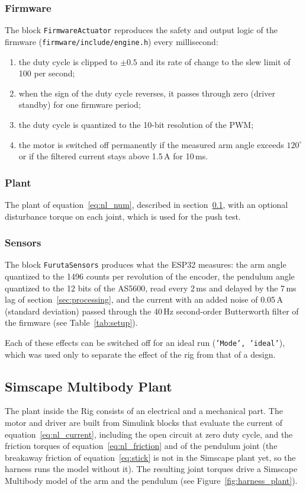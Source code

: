 \documentclass[a4paper,11pt]{article}
\begin{document}
\subsubsection{Firmware}
The block \texttt{FirmwareActuator} reproduces the safety and output logic of the firmware (\nolinkurl{firmware/include/engine.h}) every millisecond:
\begin{enumerate}
  \item the duty cycle is clipped to $\pm 0.5$ and its rate of change to the slew limit of 100 per second;
  \item when the sign of the duty cycle reverses, it passes through zero (driver standby) for one firmware period;
  \item the duty cycle is quantized to the 10-bit resolution of the PWM;
  \item the motor is switched off permanently if the measured arm angle exceeds $120^\circ$ or if the filtered current stays above 1.5\,A for 10\,ms.
\end{enumerate}

\subsubsection{Plant}
The plant of equation~\ref{eq:nl_num}, described in section~\ref{sec:harness_plant}, with an optional disturbance torque on each joint, which is used for the push test.

\subsubsection{Sensors}
The block \texttt{FurutaSensors} produces what the ESP32 measures: the arm angle quantized to the 1496 counts per revolution of the encoder, the pendulum angle quantized to the 12 bits of the AS5600, read every 2\,ms and delayed by the 7\,ms lag of section~\ref{sec:processing}, and the current with an added noise of 0.05\,A (standard deviation) passed through the 40\,Hz second-order Butterworth filter of the firmware (see Table~\ref{tab:setup}).

Each of these effects can be switched off for an ideal run (\texttt{'Mode', 'ideal'}), which was used only to separate the effect of the rig from that of a design.

\subsection{Simscape Multibody Plant}
\label{sec:harness_plant}
The plant inside the Rig consists of an electrical and a mechanical part. The motor and driver are built from Simulink blocks that evaluate the current of equation~\ref{eq:nl_current}, including the open circuit at zero duty cycle, and the friction torques of equation~\ref{eq:nl_friction} and of the pendulum joint (the breakaway friction of equation~\ref{eq:stick} is not in the Simscape plant yet, so the harness runs the model without it). The resulting joint torques drive a Simscape Multibody model of the arm and the pendulum (see Figure~\ref{fig:harness_plant}).
\end{document}
